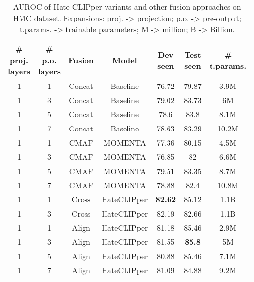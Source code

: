 \documentclass[11pt]{article}
\begin{document}
\begin{table*}[t]
\centering
\begin{tabular}{|c|c|c|c|c|c|c|}
\hline
\textbf{\# proj. layers} &
  \textbf{\# p.o. layers} &
  \textbf{Fusion} &
  \textbf{Model} &
  \textbf{Dev seen} &
  \textbf{Test seen} &
  \textbf{\# t.params.} \\
\hline
1          & 1             & Concat & Baseline                                   & 76.72          & 79.87  &3.9M        \\
1          & 3             & Concat & Baseline                                   & 79.02          & 83.73   &6M       \\
1          & 5             & Concat & Baseline                                   & 78.6           & 83.8       &8.1M    \\
1          & 7             & Concat & Baseline                                   & 78.63          & 83.29        &10.2M  \\
\hline
1          & 1             & CMAF & MOMENTA                                   & 77.36         & 80.15   &4.5M      \\
1          & 3             & CMAF & MOMENTA                                   & 76.85          & 82     &6.6M     \\
1          & 5             & CMAF & MOMENTA                                   & 79.51           & 83.35     &8.7M      \\
1          & 7             & CMAF & MOMENTA                                   & 78.88          & 82.4        &10.8M \\
\hline
1          & 1             & Cross  & HateCLIPper                                & \textbf{82.62} & 85.12          &1.1B\\
1          & 3             & Cross  & HateCLIPper                                &82.19         & 82.66          &1.1B\\
\hline
1          & 1             & Align  & HateCLIPper                                & 81.18          & 85.46          &2.9M\\
1          & 3             & Align  & HateCLIPper                                & 81.55         & \textbf{85.8}    &5M       \\
1          & 5             & Align  & HateCLIPper                                & 80.88          & 85.46 &7.1M \\
1          & 7             & Align  & HateCLIPper                                & 81.09          & 84.88     &9.2M    \\
\hline
\end{tabular}
\caption{AUROC of Hate-CLIPper variants and other fusion approaches on HMC dataset. Expansions: proj. -> projection; p.o. -> pre-output; t.params. -> trainable parameters; M -> million; B -> Billion.}
\label{tab:result-fb}
\end{table*}
\end{document}
